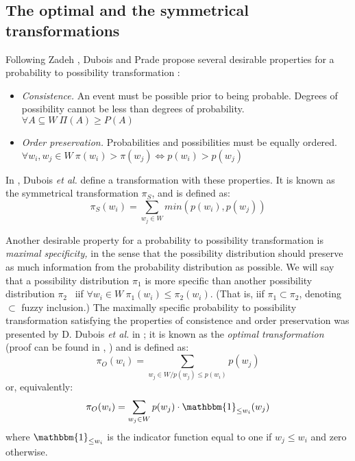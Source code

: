 \documentclass[a4paper]{article}
\begin{document}
\subsection{The optimal and the symmetrical transformations}
Following Zadeh \cite{zadeh78}, Dubois and Prade propose several desirable properties for a probability to possibility transformation \cite{Dubois82}:
\begin{itemize}
\item \textit{Consistence.} An event must be possible prior to being probable. Degrees of possibility cannot be less than degrees of probability. $\forall A  \subseteq W \ \Pi(A) \geq P(A)$
\item \textit{Order preservation.} Probabilities and possibilities must be equally ordered. $\forall w_i,w_j \in W \ \pi(w_i) > \pi(w_j) \iff p(w_i) > p(w_j)$
\end{itemize}
In \cite{Dubois:1983}, Dubois \textit{et al.} define a transformation with these properties. It is known as the symmetrical transformation $\pi_{S}$, and is defined as:
\begin{equation}
\label{symmetricaltransformation}
\pi_{S}(w_i)=\sum_{w_j \in W}min(p(w_i),p(w_j))
\end{equation}

Another desirable property for a probability to possibility  transformation is \textit{maximal specificity,} in the sense that the possibility distribution should preserve as much information from the probability distribution as possible. We will say that a possibility distribution $\pi_1$ is more specific than another possibility distribution $\pi_2$  iif $ \forall w_i \in W \ \pi_{1}(w_i) \leq \pi_{2}(w_i).$ (That is, iif $\pi_1 \subset \pi_2$, denoting $\subset$ fuzzy inclusion.) The maximally specific probability to possibility transformation satisfying the properties of consistence and order preservation was presented by D. Dubois \textit{et al.} in \cite{Dubois1993}; it is known as the \textit{optimal transformation} (proof can be found in \cite{Dubois1993}, \cite{Delgado87}) and is defined as: 
\begin{equation}
\label{optimaltransformation1}
\pi_{O}(w_i)=\sum_{w_j \in W/p(w_j)\leq p(w_i)}p(w_j)
\end{equation}
or, equivalently:
\begin{equation}
\label{optimaltransformation2}
\pi_{O}(w_i)=\sum_{w_j \in W}p(w_j)\cdot \mathbbm{1}_{\leq w_i}(w_j)
\end{equation}
where $\mathbbm{1}_{\leq w_i}$ is the indicator function equal to one if $w_j \leq w_i$ and zero otherwise.
\end{document}
